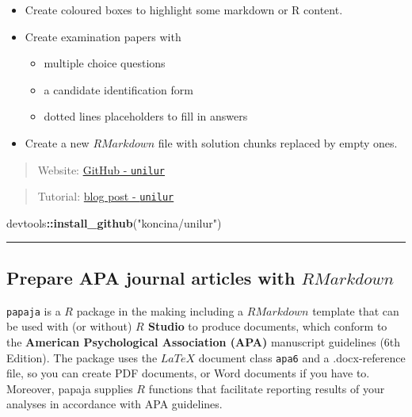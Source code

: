 \documentclass[]{book}
\newenvironment{Shaded}{\begin{snugshade}}{\end{snugshade}}
\newcommand{\KeywordTok}[1]{\textcolor[rgb]{0.13,0.29,0.53}{\textbf{#1}}}
\newcommand{\StringTok}[1]{\textcolor[rgb]{0.31,0.60,0.02}{#1}}
\newcommand{\OperatorTok}[1]{\textcolor[rgb]{0.81,0.36,0.00}{\textbf{#1}}}
\newcommand{\NormalTok}[1]{#1}
\providecommand{\tightlist}{%
  \setlength{\itemsep}{0pt}\setlength{\parskip}{0pt}}
\theoremstyle{definition}
\theoremstyle{definition}
\theoremstyle{definition}
\theoremstyle{remark}
\begin{document}
\begin{itemize}
\item
  Create coloured boxes to highlight some markdown or R content.
\item
  Create examination papers with

  \begin{itemize}
  \tightlist
  \item
    multiple choice questions
  \item
    a candidate identification form
  \item
    dotted lines placeholders to fill in answers
  \end{itemize}
\item
  Create a new \(R Markdown\) file with solution chunks replaced by
  empty ones.
\end{itemize}

\begin{quote}
Website: \href{https://github.com/koncina/unilur}{GitHub -
\texttt{unilur}}
\end{quote}

\begin{quote}
Tutorial:
\href{http://eric.koncina.eu/posts/introducing-the-unilur-rmarkdown-template/}{blog
post - \texttt{unilur}}
\end{quote}

\begin{Shaded}
\begin{Highlighting}[]
\NormalTok{devtools}\OperatorTok{::}\KeywordTok{install_github}\NormalTok{(}\StringTok{"koncina/unilur"}\NormalTok{)}
\end{Highlighting}
\end{Shaded}

\begin{center}\rule{0.5\linewidth}{\linethickness}\end{center}

\subsection{\texorpdfstring{Prepare APA journal articles with
\(R Markdown\)}{Prepare APA journal articles with R Markdown}}\label{prepare-apa-journal-articles-with-r-markdown}

\texttt{papaja} is a \(R\) package in the making including a
\(R Markdown\) template that can be used with (or without) \textbf{\(R\)
Studio} to produce documents, which conform to the \textbf{American
Psychological Association (APA)} manuscript guidelines (6th Edition).
The package uses the \(LaTeX\) document class \texttt{apa6} and a
.docx-reference file, so you can create PDF documents, or Word documents
if you have to. Moreover, papaja supplies \(R\) functions that
facilitate reporting results of your analyses in accordance with APA
guidelines.
\end{document}
